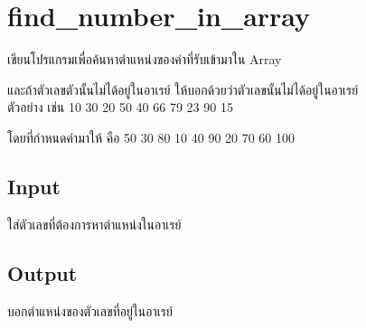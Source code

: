\documentclass{article}
\begin{document}
\section*{find_number_in_array}

เขียนโปรแกรมเพื่อค้นหาตำแหน่งของค่าที่รับเข้ามาใน Array

และถ้าตัวเลขตัวนั้นไม่ได้อยู่ในอาเรย์ ให้บอกด้วยว่าตัวเลขนั้นไม่ได้อยู่ในอาเรย์\\



ตัวอย่าง เช่น 10 30 20 50 40 66 79 23 90 15



{โดยที่กำหนดค่ามาให้ คือ 50 30 80 10 40 90 20 70 60 100}



\subsection*{Input}
ใส่ตัวเลขที่ต้องการหาตำแหน่งในอาเรย์



\subsection*{Output}
บอกตำแหน่งของตัวเลขที่อยู่ในอาเรย์
\end{document}
